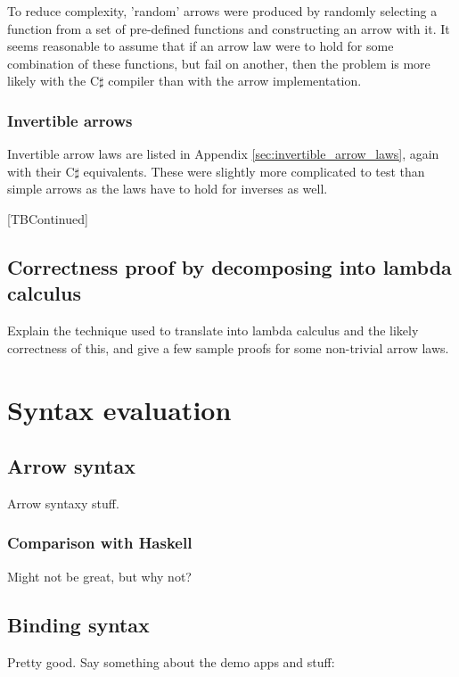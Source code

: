 \documentclass[12pt,twoside,notitlepage]{report}
\begin{document}
To reduce complexity, 'random' arrows were produced by randomly selecting a function from a set of pre-defined functions and constructing an arrow with it. It seems reasonable to assume that if an arrow law were to hold for some combination of these functions, but fail on another, then the problem is more likely with the C$\sharp$ compiler than with the arrow implementation.

\subsubsection{Invertible arrows}

Invertible arrow laws are listed in Appendix \ref{sec:invertible_arrow_laws}, again with their C$\sharp$ equivalents. These were slightly more complicated to test than simple arrows as the laws have to hold for inverses as well.

[TBContinued]

\subsection{Correctness proof by decomposing into lambda calculus}

Explain the technique used to translate into lambda calculus and the likely correctness of this, and give a few sample proofs for some non-trivial arrow laws.

\section{Syntax evaluation}

\subsection{Arrow syntax}

Arrow syntaxy stuff.

\subsubsection{Comparison with Haskell}

Might not be great, but why not?

\subsection{Binding syntax}

Pretty good. Say something about the demo apps and stuff:
\end{document}
